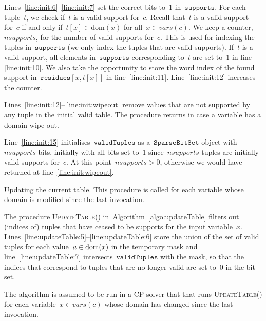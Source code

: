 \documentclass[a4paper,11pt]{article}
\newcommand{\Algoref}[1]{Algorithm~\ref{#1}}
\newcommand{\Lineref}[1]{Line~\ref{#1}}
\newcommand{\Linesref}[2]{Lines~\ref{#1}--\ref{#2}}
\newcommand{\lineref}[1]{line~\ref{#1}}
\newcommand{\Dom}[1]{\text{dom}({#1})}
\newcommand{\SparseBitSet}{\texttt{SparseBitSet}}
\newcommand{\CurrTable}{\texttt{validTuples}}
\newcommand{\Supports}{\texttt{supports}}
\newcommand{\Residues}{\texttt{residues}}
\def\UpdateTable{\textsc{UpdateTable}}
\newcommand{\localvar}[1]{\mathit{#1}}
\numberwithin{equation}{section}
\begin{document}
\Linesref{line:init:6}{line:init:7} set the correct bits to~$1$ in~$\Supports$.
For each tuple~$t$, we check if~$t$ is a valid support for~$c$. Recall that~$t$ is
a valid support for~$c$ if and only if~$t[x] \in \Dom{x}$ for all~$x \in \mathit{vars}(c)$.
We keep a counter,~$nsupports$, for the number of valid supports for~$c$.
This is used for indexing the tuples in~$\Supports$ (we only index the tuples
that are valid supports).
If~$t$ is a valid support,
all elements in~$\Supports$ corresponding to~$t$ are set to~$1$ in
line \ref{line:init:10}. We also take the opportunity to store the word index
of the found support in~$\Residues[x,t[x]]$
in line~\ref{line:init:11}. Line~\ref{line:init:12} increases the counter.

\Linesref{line:init:12}{line:init:wipeout} remove values that are not supported
by any tuple in the initial valid table. The procedure returns in case a variable
has a domain wipe-out.

\Lineref{line:init:15} initialises~$\CurrTable$ as a~$\SparseBitSet$ object with
$nsupports$ bits, initially with all bits set to~$1$ since~$nsupports$
tuples are initially valid supports for~$c$.
At this point~$\localvar{nsupports} > 0$,
otherwise we would have returned at line~\ref{line:init:wipeout}.

  \begin{algorithm}[H]
  \begin{algorithmic}[1]  %
    
  \end{algorithmic}
  \caption{Updating the current table. This procedure is called for 
    each variable whose domain is modified since the last invocation.}
  \label{algo:updateTable}
\end{algorithm}

  The procedure \UpdateTable() in~\Algoref{algo:updateTable}
  filters out (indices of)
  tuples that have ceased to be supports for the input variable~$x$.
  \Linesref{line:updateTable:5}{line:updateTable:6} store the union of the
  set of valid tuples for each value~$a \in \text{dom}(x)$ in the temporary mask
  and \lineref{line:updateTable:7} intersects~$\CurrTable$ with the mask,
  so that the indices that correspond to tuples that are no longer valid
  are set to~$0$ in the bit-set.

  The algorithm is assumed to be run in a CP solver that that runs \UpdateTable()
  for each variable~$x \in \mathit{vars}(c)$ whose domain has changed since the
  last invocation.
  
\end{document}
